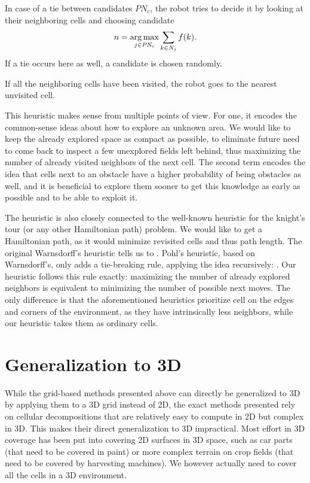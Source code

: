 \documentclass[buriama8_dp.tex]{subfiles}
\begin{document}
In case of a tie between candidates \(\textit{PN}_c\), the robot tries to decide it by looking at their neighboring cells and choosing candidate
\[
n = \operatorname*{arg\,max}_{j \in \textit{PN}_c} \sum_{k \in N_j} f(k).
\]
If a tie occurs here as well, a candidate is chosen randomly.

If all the neighboring cells have been visited, the robot goes to the nearest unvisited cell.

This heuristic makes sense from multiple points of view. For one, it encodes the common-sense ideas about how to explore an unknown area. We would like to keep the already explored space as compact as possible, to eliminate future need to come back to inspect a few unexplored fields left behind, thus maximizing the number of already visited neighbors of the next cell. The second term encodes the idea that cells next to an obstacle have a higher probability of being obstacles as well, and it is beneficial to explore them sooner to get this knowledge as early as possible and to be able to exploit it.

The heuristic is also closely connected to the well-known heuristic for the knight's tour (or any other Hamiltonian path) problem. We would like to get a Hamiltonian path, as it would minimize revisited cells and thus path length. The original Warnsdorff's heuristic tells us to . Pohl's heuristic, based on Warnsdorff's, only adds a tie-breaking rule, applying the idea recursively: . Our heuristic follows this rule exactly: maximizing the number of already explored neighbors is equivalent to minimizing the number of possible next moves. The only difference is that the aforementioned heuristics prioritize cell on the edges and corners of the environment, as they have intrinsically less neighbors, while our heuristic takes them as ordinary cells.

\section{Generalization to 3D}

While the grid-based methods presented above can directly be generalized to 3D by applying them to a 3D grid instead of 2D, the exact methods presented rely on cellular decompositions that are relatively easy to compute in 2D but complex in 3D. This makes their direct generalization to 3D impractical. Most effort in 3D coverage has been put into covering 2D surfaces in 3D space, such as car parts (that need to be covered in paint) or more complex terrain on crop fields (that need to be covered by harvesting machines). We however actually need to cover all the cells in a 3D environment.
\end{document}
